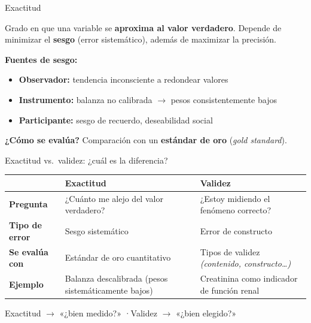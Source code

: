 \documentclass[aspectratio=169, 12pt, xcolor=table]{beamer}
\begin{document}
\begin{frame}{Exactitud}
  \begin{definicion}[Exactitud]
    Grado en que una variable se \textbf{aproxima al valor verdadero}.
    Depende de minimizar el \textbf{sesgo} (error sistemático), además
    de maximizar la precisión.
  \end{definicion}

  \vspace{8pt}
  \textbf{Fuentes de \textcolor{accent}{sesgo}:}
  \begin{itemize}
    \item \textbf{Observador:} tendencia inconsciente a redondear valores
    \item \textbf{Instrumento:} balanza no calibrada $\to$ pesos consistentemente bajos
    \item \textbf{Participante:} sesgo de recuerdo, deseabilidad social
  \end{itemize}

  \vspace{4pt}
  \textbf{¿Cómo se evalúa?} Comparación con un \textbf{estándar de oro}
  (\textit{gold standard}).
\end{frame}

\begin{frame}[t]{Exactitud vs.\ validez: ¿cuál es la diferencia?}
  \footnotesize
  \begin{tabular}{p{2.8cm} p{4.6cm} p{4.6cm}}
    \toprule
    & \textbf{\textcolor{accent}{Exactitud}} & \textbf{\textcolor{accent}{Validez}} \\
    \midrule
    \textbf{Pregunta} &
      ¿Cuánto me alejo del valor verdadero? &
      ¿Estoy midiendo el fenómeno correcto? \\[4pt]
    \textbf{Tipo de error} &
      Sesgo sistemático &
      Error de constructo \\[4pt]
    \textbf{Se evalúa con} &
      Estándar de oro cuantitativo &
      Tipos de validez \textit{(contenido, constructo\ldots)} \\[4pt]
    \textbf{Ejemplo} &
      Balanza descalibrada (pesos sistemáticamente bajos) &
      Creatinina como indicador de función renal \\
    \bottomrule
  \end{tabular}

  \vspace{6pt}
  \begin{nota}
    Exactitud $\to$ «¿bien medido?» \quad·\quad Validez $\to$ «¿bien elegido?»
  \end{nota}
\end{frame}
\end{document}
